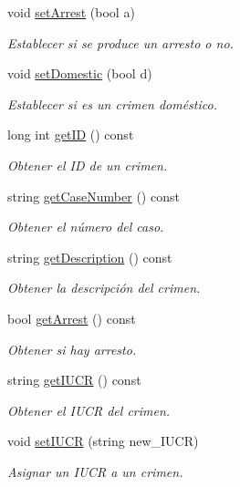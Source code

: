 \begin{DoxyCompactItemize}
void \hyperlink{classcrimen_ae08b85470038469179a01ba753b7641a}{set\+Arrest} (bool a)
\begin{DoxyCompactList}\small\item\em Establecer si se produce un arresto o no. \end{DoxyCompactList}\item 
void \hyperlink{classcrimen_a3ec14cf4bb0464350d8efd98d2679d41}{set\+Domestic} (bool d)
\begin{DoxyCompactList}\small\item\em Establecer si es un crimen doméstico. \end{DoxyCompactList}\item 
long int \hyperlink{classcrimen_aa33f92f889c7f1815ed4bfd56c578bce}{get\+I\+D} () const 
\begin{DoxyCompactList}\small\item\em Obtener el I\+D de un crimen. \end{DoxyCompactList}\item 
string \hyperlink{classcrimen_ab3c025eb20cdcea9192ee190fa2af015}{get\+Case\+Number} () const 
\begin{DoxyCompactList}\small\item\em Obtener el número del caso. \end{DoxyCompactList}\item 
string \hyperlink{classcrimen_a61789d65209d167149df197272d8feba}{get\+Description} () const 
\begin{DoxyCompactList}\small\item\em Obtener la descripción del crimen. \end{DoxyCompactList}\item 
bool \hyperlink{classcrimen_a6cab67bfdad566ce444236fc7c8df312}{get\+Arrest} () const 
\begin{DoxyCompactList}\small\item\em Obtener si hay arresto. \end{DoxyCompactList}\item 
string \hyperlink{classcrimen_a8738020069c3a3b3500d044f9580f93a}{get\+I\+U\+C\+R} () const 
\begin{DoxyCompactList}\small\item\em Obtener el I\+U\+C\+R del crimen. \end{DoxyCompactList}\item 
void \hyperlink{classcrimen_a1f64e937436244d47af1f92cb63c7254}{set\+I\+U\+C\+R} (string new\+\_\+\+I\+U\+C\+R)
\begin{DoxyCompactList}\small\item\em Asignar un I\+U\+C\+R a un crimen. \end{DoxyCompactList}\item 

\end{DoxyCompactItemize}
